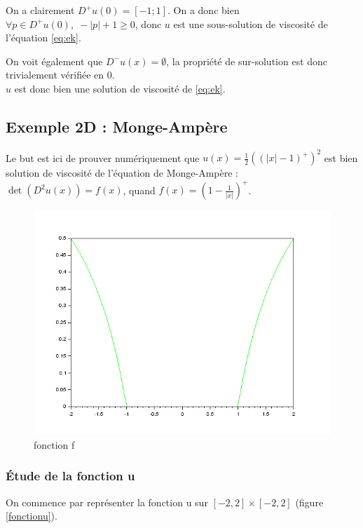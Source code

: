 \documentclass[12pt,a4paper,twoside]{article}
\begin{document}
On a clairement $D^{+}u(0) = [-1; 1]$. 
On a donc bien $\forall p \in D^{+}u(0), \; - |p| + 1 \geq 0$, donc $u$ est une sous-solution de viscosité
de l'équation \ref{eq:ek}.

On voit également que $D^{-}u(x) = \emptyset$, la propriété de sur-solution est donc trivialement vérifiée en 0. \\

$u$ est donc bien une solution de viscosité de \ref{eq:ek}.



\subsection{Exemple 2D : Monge-Ampère}

Le but est ici de prouver numériquement que $u(x) = \frac{1}{2}((|x|-1)^{+})^2$ est bien solution de viscosité de l'équation de Monge-Ampère : $\det(D^2 u(x) )= f(x)$, quand $f(x) = (1 - \frac{1}{|x|})^{+}$.

\begin{figure}[!h]
\begin{center}
\includegraphics[scale=0.5]{Images/fig4.png}
\caption{fonction f} 
\end{center}
\end{figure}

\subsubsection{Étude de la fonction u}


On commence par représenter la fonction u sur $[-2,2]\times[-2,2]$ (figure \ref{fonctionu}).
\end{document}

